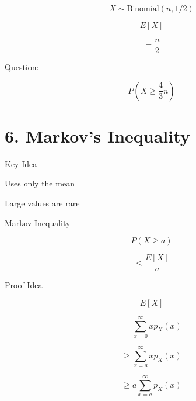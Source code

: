\documentclass[12pt]{article}
\begin{document}
\[
X \sim \text{Binomial}(n, 1/2)
\]

\vspace{0.5em}

\[
E[X]
\]

\vspace{0.5em}

\[
= \frac{n}{2}
\]

\vspace{1em}

Question:

\vspace{0.5em}

\[
P(X \geq \frac{4}{3}n)
\]

\vspace{2em}

\section*{6. Markov’s Inequality}

\vspace{0.5em}

Key Idea

Uses only the mean

Large values are rare

\vspace{1em}

Markov Inequality

\vspace{0.5em}

\[
P(X \geq a)
\]

\vspace{0.5em}

\[
\leq \frac{E[X]}{a}
\]

\vspace{1em}

Proof Idea

\vspace{0.5em}

\[
E[X]
\]

\vspace{0.5em}

\[
= \sum_{x=0}^{\infty} x p_X(x)
\]

\vspace{0.5em}

\[
\geq \sum_{x=a}^{\infty} x p_X(x)
\]

\vspace{0.5em}

\[
\geq a \sum_{x=a}^{\infty} p_X(x)
\]

\vspace{0.5em}
\end{document}
